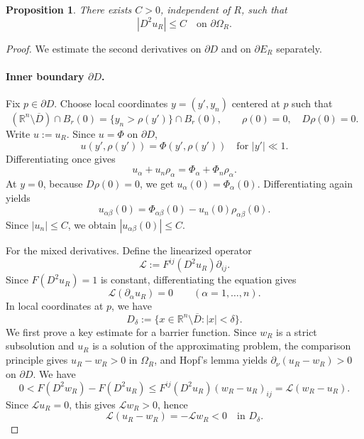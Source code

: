 \documentclass[reqno,a4paper]{amsart}
\numberwithin{equation}{section}
\newtheorem{proposition}{Proposition}[section]
\begin{document}
	\begin{proposition}
		There exists $C > 0$, independent of $R$, such that
		\[
		|D^2 u_R| \le C \quad \text{on } \partial \Omega_R.
		\]
	\end{proposition}
	
	\begin{proof}
		We estimate the second derivatives on $\partial D$ and on $\partial E_R$ separately.
		
		\paragraph{Inner boundary $\partial D$.}
		Fix $p \in \partial D$. Choose local coordinates $y = (y', y_n)$ centered at $p$ such that
		\[
		(\mathbb{R}^n \setminus \overline{D}) \cap B_r(0) = \{ y_n > \rho(y') \} \cap B_r(0), \qquad \rho(0) = 0, \quad D\rho(0) = 0.
		\]
		Write $u := u_R$. Since $u = \Phi$ on $\partial D$,
		\[
		u(y', \rho(y')) = \Phi(y', \rho(y')) \quad \text{for } |y'| \ll 1.
		\]
		Differentiating once gives
		\[
		u_\alpha + u_n \rho_\alpha = \Phi_\alpha + \Phi_n \rho_\alpha.
		\]
		At $y=0$, because $D\rho(0)=0$, we get $u_\alpha(0) = \Phi_\alpha(0)$. Differentiating again yields
		\[
		u_{\alpha\beta}(0) = \Phi_{\alpha\beta}(0) - u_n(0)\rho_{\alpha\beta}(0).
		\]
		Since $|u_n| \le C$, we obtain $|u_{\alpha\beta}(0)| \le C$.
		
		
		For the mixed derivatives.
		Define the linearized operator
		\begin{equation}
			\mathcal{L} := F^{ij}(D^2 u_R)\partial_{ij}. \label{eq:L_mixed}
		\end{equation}
		Since $F(D^2 u_R)=1$ is constant, differentiating the equation gives
		\begin{equation}
			\mathcal{L}(\partial_\alpha u_R)=0 \qquad (\alpha=1,\dots,n). \label{eq:Lder_mixed}
		\end{equation}
		In local coordinates at $p$, we have
		$$D_\delta := \{ x \in \mathbb{R}^n \setminus \overline{D} : |x| < \delta \}.$$
		We first prove a key estimate for a barrier function. 
		Since $w_R$ is a strict subsolution and $u_R$ is a solution of the approximating problem, 
		the comparison principle gives $u_R-w_R>0$ in $\Omega_R$, and Hopf's lemma yields 
		$\partial_\nu(u_R-w_R)>0$ on $\partial D$. 
		We have
		\begin{equation}
			0<F(D^2w_R)-F(D^2u_R)
			\le F^{ij}(D^2u_R)(w_R-u_R)_{ij}
			= \mathcal{L}(w_R-u_R). \label{eq:concavity_zeta_mixed}
		\end{equation}
		Since $\mathcal{L}u_R=0$, this gives $\mathcal{L}w_R>0$, hence
		\begin{equation}
			\mathcal{L}(u_R-w_R)=-\mathcal{L}w_R<0 \quad \text{in } D_\delta. \label{eq:Luw_zeta_mixed}
		\end{equation}
		

\end{proof}
\end{document}
